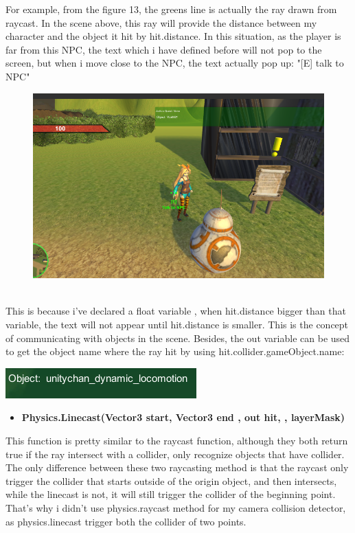 \documentclass[a4paper, 13pt]{extarticle}
\begin{document}
 	For example, from the figure 13, the greens line is actually the ray drawn from raycast. In the scene above, this ray will provide the distance between my character and the object it hit by hit.distance. In this situation, as the player is far from this NPC, the text which i have defined before will not pop to the screen, but when i move close to the NPC, the text actually pop up: "[E] talk to NPC"
 	\begin{figure}[h]
 		
 			\begin{minipage}{1\textwidth}
 				\centering
 				\includegraphics[width=0.5\linewidth]{intructions/text_popup.png}
 				\centering
 				\label{fig:test15}
 			\end{minipage}
 		\end{figure}
 	\\[0.05cm]
 	This is because i've declared a float variable , when hit.distance bigger than that variable, the text will not appear until hit.distance is smaller. This is the concept of communicating with objects in the scene. Besides, the out variable can be used to get the object name where the ray hit by using hit.collider.gameObject.name: 	
 	\noindent\begin{minipage}{0.3\textwidth}%
 		\includegraphics[width=\linewidth]{intructions/objectname.png}
 	\end{minipage}%
 	\newpage
 	\begin{itemize}
 		\item \bfseries Physics.Linecast(Vector3 start,  Vector3 end , out hit, , layerMask)	 	
 	\end{itemize}
 		This function is pretty similar to the raycast function, although they both return true if the ray intersect with a collider, only recognize objects that have collider. The only difference between these two raycasting method is that the raycast only trigger the collider that starts outside of the origin object, and then intersects,  while the linecast is not, it will still trigger the collider of the beginning point. That's why i didn't use physics.raycast method for my camera collision detector, as physics.linecast trigger both the collider of two points.
 
\end{document}
